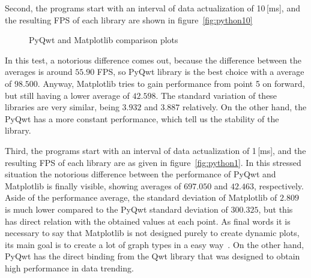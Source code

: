 Second, the programs start with an interval of data actualization of 10\,[ms],
and the resulting FPS of each library are shown in figure~\ref{fig:python10}
\begin{figure}%
  \label{fig:figure3}
  \caption{PyQwt and Matplotlib comparison plots}
\end{figure}
In this test, a notorious difference comes out,
because the difference between the averages is around $55.90$
FPS, so PyQwt library is the best choice with a average of $98.500$.
Anyway, Matplotlib tries to gain performance from point 5 on forward, but still having
a lower average of $42.598$.
The standard variation of these libraries are very  similar, being $3.932$ and $3.887$ relatively.
On the other hand, the PyQwt has a more constant performance,
which tell us the stability of the library.

Third, the programs start with an interval of data actualization of 1\,[ms],
and the resulting FPS of each library are as given in figure~\ref{fig:python1}.
In this stressed situation the notorious
difference between the performance of PyQwt and Matplotlib
is finally visible,
showing averages of $697.050$ and $42.463$, respectively.
Aside of the performance average, the standard deviation of Matplotlib of $2.809$ is
much lower compared to the PyQwt standard deviation of $300.325$, but this has
direct relation with the obtained values at each point.
As final words it is necessary to say that Matplotlib is not
designed purely to create dynamic plots, its main goal
is to create a lot of graph types in a easy way~\cite{matplotlib-paper}.
On the other hand, PyQwt has the direct binding from the Qwt library
that was designed to obtain high performance in data trending.

